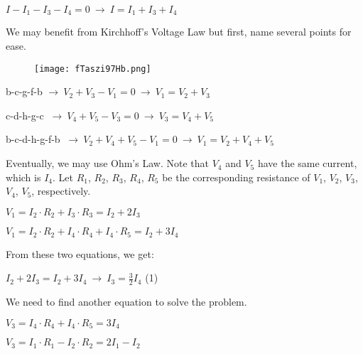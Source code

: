 \documentclass{article}
\begin{document}
{\Large $I - I_1 - I_3 - I_4 = 0 \ \rightarrow \ I = I_1 + I_3 + I_4 $}

\vspace{4mm}

{\Large We may benefit from Kirchhoff's Voltage Law but first, name several points for ease.}

\begin{figure}[H]
    \centering
    \texttt{[image: fTaszi97Hb.png]}
\end{figure}

{\Large b-c-g-f-b $ \rightarrow \ V_2 + V_3 - V_1 = 0 \ \rightarrow \  V_1 = V_2 + V_3 $}

{\Large c-d-h-g-c $\ \rightarrow \ V_4 + V_5 - V_3 = 0 \ \rightarrow \ V_3 = V_4 + V_5 $}

{\Large b-c-d-h-g-f-b $\ \rightarrow \ V_2 + V_4 + V_5 - V_1 = 0 \ \rightarrow \ V_1 = V_2 + V_4 + V_5 $}

\vspace{4mm}

{\Large Eventually, we may use Ohm's Law. Note that $V_4$ and $V_5$ have the same current, which is $I_4$. Let $R_1$, $R_2$, $R_3$, $R_4$, $R_5$ be the corresponding resistance of $V_1$, $V_2$, $V_3$, $V_4$, $V_5$, respectively.}

\vspace{4mm}

{\Large $V_1 = I_2\cdot R_2 + I_3\cdot R_3 = I_2 + 2I_3$}

{\Large $V_1 = I_2\cdot R_2 + I_4 \cdot R_4 + I_4 \cdot R_5 = I_2 + 3I_4$}

\vspace{4mm}

{\Large From these two equations, we get:}

\vspace{4mm}

{\Large $\displaystyle I_2 + 2I_3 = I_2 + 3I_4 \ \rightarrow \ I_3 = \frac{3}{2}I_4$ (1)}

\vspace{4mm}

{\Large We need to find another equation to solve the problem.}

\vspace{4mm}

{\Large $V_3 = I_4\cdot R_4 + I_4\cdot R_5 = 3I_4$}

{\Large $V_3 = I_1\cdot R_1 - I_2\cdot R_2 = 2I_1 - I_2$}

\vspace{4mm}
\end{document}

